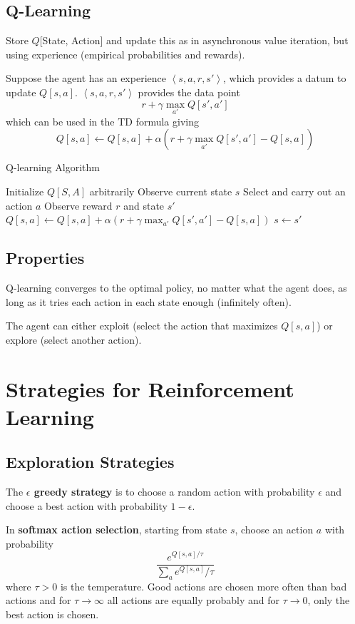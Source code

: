 \documentclass[11pt]{article}
\begin{document}
\subsection{Q-Learning}
\label{sec:org0463543}
Store \(Q\){[}State, Action] and update this as in asynchronous value iteration, but using
experience (empirical probabilities and rewards).

Suppose the agent has an experience \(\left< s, a, r, s' \right>\), which provides a datum to
update \(Q[s, a]\).
\(\left< s, a, r, s' \right>\) provides the data point
$$ r + \gamma \max_{a'} Q[s', a'] $$
which can be used in the TD formula giving
$$ Q[s, a] \gets Q[s, a] + \alpha \left( r + \gamma \max_{a'} Q[s', a'] - Q[s, a] \right) $$

\begin{algorithm}
\caption{Q-learning Algorithm}
\begin{algorithmic}[1]
\State Initialize \( Q[S, A] \) arbitrarily
\State Observe current state \( s \)
\Repeat
    \State Select and carry out an action \( a \)
    \State Observe reward \( r \) and state \( s' \)
    \State \( Q[s, a] \gets Q[s, a] + \alpha \left( r + \gamma \max_{a'} Q[s', a'] - Q[s, a] \right) \)
    \State \( s \gets s' \)
\end{algorithmic}
\end{algorithm}
\subsection{Properties}
\label{sec:orgc6fddc4}
Q-learning converges to the optimal policy, no matter what the agent does, as long as it tries
each action in each state enough (infinitely often).

The agent can either exploit (select the action that maximizes \(Q[s, a]\)) or
explore (select another action).
\section{Strategies for Reinforcement Learning}
\label{sec:org6e12644}
\subsection{Exploration Strategies}
\label{sec:org3ecf1d9}
The \textbf{\(\epsilon\) greedy strategy} is to choose a random action with probability \(\epsilon\) and choose
a best action with probability \(1-\epsilon\).

In \textbf{softmax action selection}, starting from state \(s\), choose an action \(a\) with probability
$$ \frac{e^{Q[s, a] / \tau}}{\sum_{a} e^{Q[s, a]} / \tau} $$
where \(\tau > 0\) is the temperature.
Good actions are chosen more often than bad actions and for \(\tau \to \infty\) all actions are
equally probably and for \(\tau \to 0\), only the best action is chosen.
\end{document}
